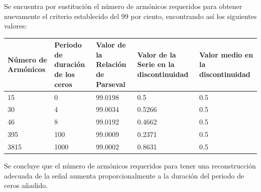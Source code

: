 \documentclass[7pt]{article}
\begin{document}
    Se encuentra por sustitución el número de armónicos requeridos para obtener 
    nuevamente el criterio establecido del 99 por ciento, encontrando así los siguientes 
    valores:

    \begin{table}[H]
        \begin{center}
            \begin{tabular}{| m{2.5cm} | m{2.5cm} | m{2.5cm} | m{2.5cm} | m{2.5cm} |}
                \hline
                \textbf{Número de Armónicos} & \textbf{Periodo de duración de los ceros} & \textbf{Valor de la Relación de Parseval} & \textbf{Valor de la Serie en la discontinuidad} & \textbf{Valor medio en la discontinuidad} \\ \hline
                15 & 0 & 99.0198 & 0.5 & 0.5 \\ \hline
                30 & 4 & 99.0034 & 0.5266 & 0.5 \\ \hline
                46 & 8 & 99.0192 & 0.4662 & 0.5 \\ \hline
                395 & 100 & 99.0009 & 0.2371 & 0.5 \\ \hline
                3815 & 1000 & 99.0002 & 0.8631 & 0.5 \\ \hline
            \end{tabular}
        \end{center}
    \end{table}

    Se concluye que el número de armónicos requeridos para tener una reconstrucción 
    adecuada de la señal aumenta proporcionalmente a la duración del periodo de ceros 
    añadido.
\end{document}
